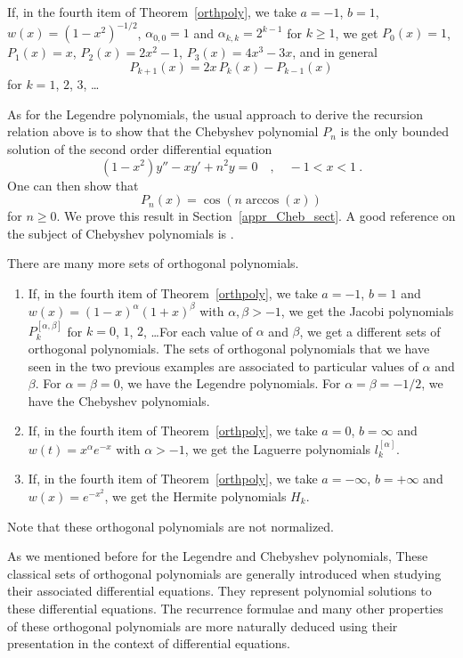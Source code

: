 \begin{egg}
If, in the fourth item of Theorem~\ref{orthpoly}, we take $a=-1$,
$b=1$, $w(x)=(1-x^2)^{-1/2}$, $\alpha_{0,0} = 1$ and $\alpha_{k,k} = 2^{k-1}$ for
$k\geq 1$, we get $P_0(x) = 1$, $P_1(x) = x$, $P_2(x) = 2x^2 -1$,
$P_3(x) = 4x^3 -3x$, and in general
\[
  P_{k+1}(x) = 2x\,P_k(x) - P_{k-1}(x)
\]
for $k=1$, $2$, $3$, \ldots
\label{appr_cheb_egg}

As for the Legendre polynomials, the usual approach to derive the
recursion relation above is to show that the Chebyshev polynomial $P_n$
is the only bounded solution of the 
second order differential equation
\[
  (1-x^2) y'' - xy' + n^2 y = 0 \quad , \quad -1 < x < 1 \ .
\]
One can then show that
\[
  P_n(x) = \cos(n \arccos(x))
\]
for $n \geq 0$.  We prove this result in Section~\ref{appr_Cheb_sect}.
A good reference on the subject of Chebyshev polynomials is \cite{GS}.
\end{egg}

\begin{egg}
There are many more sets of orthogonal polynomials. 
\begin{enumerate}
\item If, in the fourth item of Theorem~\ref{orthpoly}, we take
$a=-1$, $b=1$ and $w(x) = (1-x)^\alpha (1+x)^\beta$ with
$\alpha,\beta>-1$, we get the Jacobi polynomials
$P_k^{[\alpha,\beta]}$ for $k=0$, $1$, $2$, \ldots\quad   For each
value of $\alpha$ and $\beta$, we get a different sets of orthogonal
polynomials.   The sets of orthogonal polynomials that we have
seen in the two previous examples are associated to particular values
of $\alpha$ and $\beta$.  For $\alpha = \beta = 0$, we have the
Legendre polynomials.  For $\alpha = \beta = -1/2$, we have the
Chebyshev polynomials.
\item If, in the fourth item of Theorem~\ref{orthpoly}, we take $a=0$,
$b=\infty$ and $w(t) = x^\alpha e^{-x}$ with $\alpha > -1$, we get the
Laguerre polynomials $l_k^{[\alpha]}$. 
\item If, in the fourth item of Theorem~\ref{orthpoly}, we take
$a=-\infty$, $b=+\infty$ and $w(x) = e^{-x^2}$, we get the 
Hermite polynomials $H_k$.
\end{enumerate}
Note that these orthogonal polynomials are not normalized.

As we mentioned before for the Legendre and Chebyshev polynomials,
These classical sets of orthogonal polynomials are generally introduced
when studying their associated differential equations.  They
represent polynomial solutions to these differential equations.  The
recurrence formulae and many other properties of these orthogonal
polynomials are more naturally deduced using their presentation in the
context of differential equations.
\end{egg}

